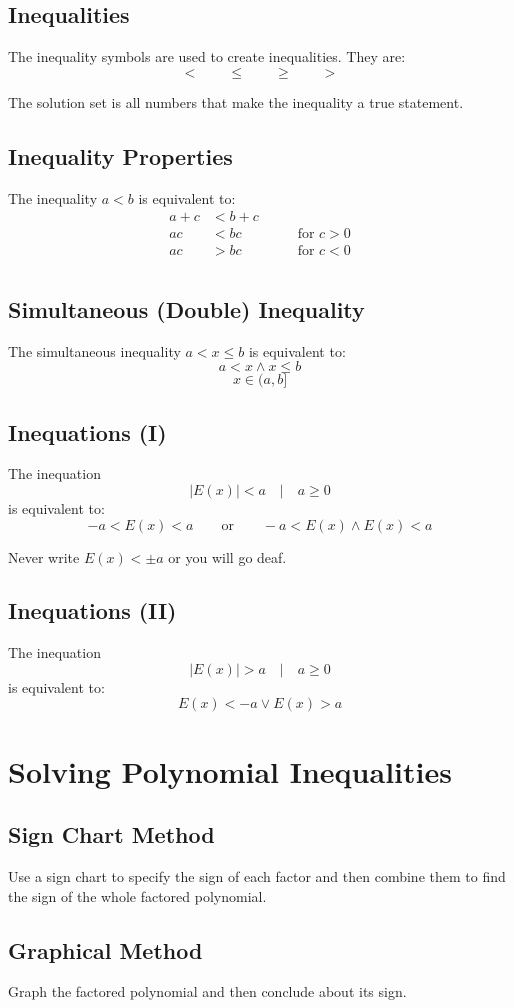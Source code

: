 		\subsection{Inequalities}
			The inequality symbols are used to create inequalities. They are:
			\[< \qquad \leq \qquad \geq \qquad >\]
			
			The solution set is all numbers that make the inequality a true statement.
		\subsection{Inequality Properties}
			The inequality $a<b$ is equivalent to:
			\begin{align*}
				a + c &< b + c\\
				ac &< bc \qquad\qquad \text{for } c>0\\
				ac &> bc \qquad\qquad \text{for } c<0\\
			\end{align*}
		\subsection{Simultaneous (Double) Inequality}
			The simultaneous inequality $a < x \leq b$ is equivalent to:
			\[a < x \wedge x \leq b\]
			\[x \in (a, b]\]
		\subsection{Inequations (I)}
			The inequation
			\[|E(x)| < a \quad | \quad a \geq 0\]
			is equivalent to:
			\[-a < E(x) < a \qquad \text{or} \qquad -a < E(x) \wedge E(x) < a\]

			Never write $E(x) < \pm a$ or you will go deaf.
		\subsection{Inequations (II)}
			The inequation
			\[|E(x)| > a \quad | \quad a \geq 0\]
			is equivalent to:
			\[E(x) < -a \vee E(x) > a\]
	\section{Solving Polynomial Inequalities}
		\subsection{Sign Chart Method}
			Use a sign chart to specify the sign of each factor and then combine them to find the sign of the whole factored polynomial.
		\subsection{Graphical Method}
			Graph the factored polynomial and then conclude about its sign.
